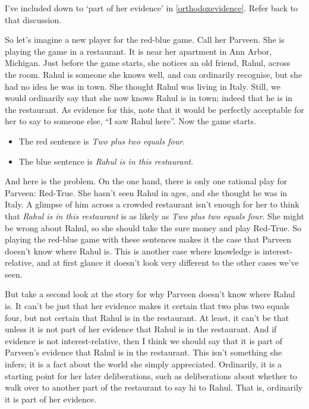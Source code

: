 \documentclass[11pt,]{book}
\providecommand{\tightlist}{%
  \setlength{\itemsep}{0pt}\setlength{\parskip}{0pt}}
\begin{document}
\begin{description}
\tightlist
\item[Note to self]
I've included down to `part of her evidence' in \ref{orthodoxevidence}. Refer back to that discussion.
\end{description}

So let's imagine a new player for the red-blue game. Call her Parveen. She is playing the game in a restaurant. It is near her apartment in Ann Arbor, Michigan. Just before the game starts, she notices an old friend, Rahul, across the room. Rahul is someone she knows well, and can ordinarily recognise, but she had no idea he was in town. She thought Rahul was living in Italy. Still, we would ordinarily say that she now knows Rahul is in town; indeed that he is in the restaurant. As evidence for this, note that it would be perfectly acceptable for her to say to someone else, ``I saw Rahul here''. Now the game starts.

\begin{itemize}
\tightlist
\item
  The red sentence is \emph{Two plus two equals four}.
\item
  The blue sentence is \emph{Rahul is in this restaurant}.
\end{itemize}

And here is the problem. On the one hand, there is only one rational play for Parveen: Red-True. She hasn't seen Rahul in ages, and she thought he was in Italy. A glimpse of him across a crowded restaurant isn't enough for her to think that \emph{Rahul is in this restaurant} is as likely as \emph{Two plus two equals four}. She might be wrong about Rahul, so she should take the sure money and play Red-True. So playing the red-blue game with these sentences makes it the case that Parveen doesn't know where Rahul is. This is another case where knowledge is interest-relative, and at first glance it doesn't look very different to the other cases we've seen.

But take a second look at the story for why Parveen doesn't know where Rahul is. It can't be just that her evidence makes it certain that two plus two equals four, but not certain that Rahul is in the restaurant. At least, it can't be that unless it is not part of her evidence that Rahul is in the restaurant. And if evidence is not interest-relative, then I think we should say that it is part of Parveen's evidence that Rahul is in the restaurant. This isn't something she infers; it is a fact about the world she simply appreciated. Ordinarily, it is a starting point for her later deliberations, such as deliberations about whether to walk over to another part of the restaurant to say hi to Rahul. That is, ordinarily it is part of her evidence.
\end{document}
